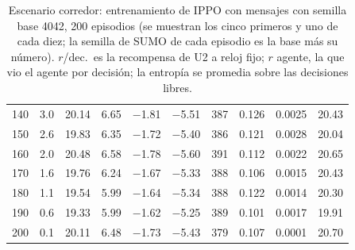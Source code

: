 \begin{table}[H]
\begin{tabular}{rrrrrrrrrr}
140 & 3.0 & 20.14 & 6.65 & $-$1.81 & $-$5.51 & 387 & 0.126 & 0.0025 & 20.43 \\
150 & 2.6 & 19.83 & 6.35 & $-$1.72 & $-$5.40 & 386 & 0.121 & 0.0028 & 20.04 \\
160 & 2.0 & 20.48 & 6.58 & $-$1.78 & $-$5.60 & 391 & 0.112 & 0.0022 & 20.65 \\
170 & 1.6 & 19.76 & 6.24 & $-$1.67 & $-$5.33 & 388 & 0.106 & 0.0015 & 20.43 \\
180 & 1.1 & 19.54 & 5.99 & $-$1.64 & $-$5.34 & 388 & 0.122 & 0.0014 & 20.30 \\
190 & 0.6 & 19.33 & 5.99 & $-$1.62 & $-$5.25 & 389 & 0.101 & 0.0017 & 19.91 \\
200 & 0.1 & 20.11 & 6.48 & $-$1.73 & $-$5.43 & 379 & 0.107 & 0.0001 & 20.70 \\
\bottomrule
\end{tabular}
\caption[Escenario corredor: entrenamiento de IPPO con mensajes, semilla base 4042]{Escenario corredor: entrenamiento de IPPO con mensajes con semilla base 4042, 200 episodios (se muestran los cinco primeros y uno de cada diez; la semilla de SUMO de cada episodio es la base más su número). $r$/dec.\ es la recompensa de U2 a reloj fijo; $r$ agente, la que vio el agente por decisión; la entropía se promedia sobre las decisiones libres.}
\label{tab:corredor-ippo-vecinos-4042}
\end{table}

